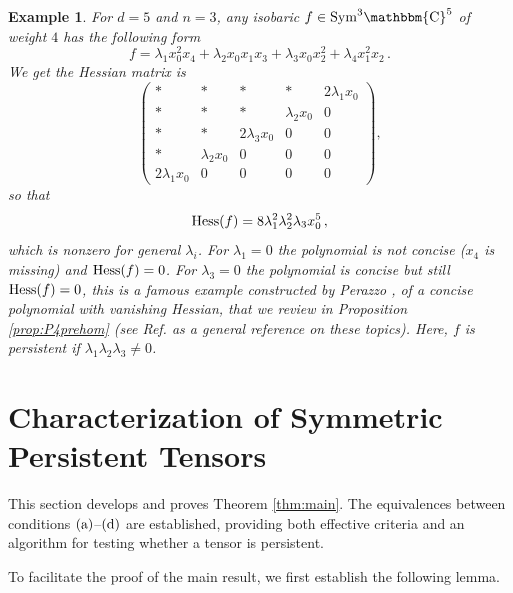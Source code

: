 \documentclass[aps,floatfix,groupedaddress,superscriptaddress,longbibliography,footinbib,notitlepage,showpacs]{revtex4-1}
\def\Hess{{\rm Hess}}
\newtheorem{example}[theorem]{Example}
\begin{document}
\begin{example}\label{exa:weight4} For $d=5$ and $n=3$, any isobaric $f\in\rm{Sym}^3\mathbbm{C}^5$ of weight $4$ has the following form
\[
f=\lambda_1x_0^2x_4+\lambda_2x_0x_1x_3+\lambda_3x_0x_2^2+\lambda_4x_1^2x_2\,.
\]
We get the Hessian matrix is
\[
\begin{pmatrix}
*&*&*&*&2\lambda_1x_0\\
*&*&*&\lambda_2x_0&0\\
*&*&2\lambda_3x_0&0&0\\
*&\lambda_2x_0&0&0&0\\
2\lambda_1x_0&0&0&0&0
\end{pmatrix},
\]
so that
\[
\Hess(f)=8\lambda_1^2\lambda_2^2\lambda_3x_0^5\,,
\]
which is nonzero for general $\lambda_i$. For $\lambda_1=0$ the polynomial is not concise ($x_4$ is missing) and
$\Hess(f)=0$. For $\lambda_3=0$ the polynomial is concise but still $\Hess(f)=0$, this is a famous example constructed by Perazzo \cite{Per}, of a concise polynomial with vanishing Hessian, that we review in Proposition \ref{prop:P4prehom} (see Ref. \cite{Ru} as a general reference on these topics). Here, $f$ is persistent if $\lambda_1\lambda_2\lambda_3\neq0$.
\end{example}

\section{Characterization of Symmetric Persistent Tensors}\label{sec.iii}

This section develops and proves Theorem \ref{thm:main}. The equivalences between conditions $(\textnormal{a})$–$(\textnormal{d})$ are established, providing both effective criteria and an algorithm for testing whether a tensor is persistent.

To facilitate the proof of the main result, we first establish the following lemma.
\end{document}
